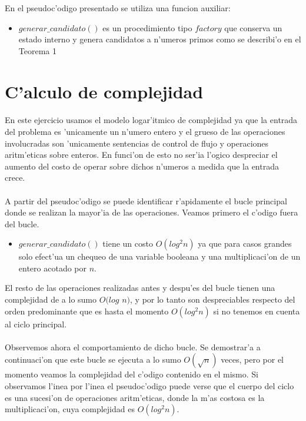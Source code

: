 En el pseudoc'odigo presentado se utiliza una funcion auxiliar:
\begin{itemize}
\item $generar\_candidato()$ es un procedimiento tipo $factory$ que conserva un estado interno 
y genera candidatos a n'umeros primos como se describi'o en el Teorema 1
\end{itemize}

\section{C'alculo de complejidad}
\paragraph{}
En este ejercicio usamos el modelo logar'itmico de complejidad ya que la entrada del problema es 'unicamente un
n'umero entero y el grueso de las operaciones involucradas son 'unicamente sentencias de control de flujo
y operaciones aritm'eticas sobre enteros. En funci'on de esto no ser'ia l'ogico despreciar el aumento del costo
de operar sobre dichos n'umeros a medida que la entrada crece.

\paragraph{}
A partir del pseudoc'odigo se puede identificar r'apidamente el bucle principal donde se realizan la mayor'ia
de las operaciones. Veamos primero el c'odigo fuera del bucle.
\begin{itemize}
\item $generar\_candidato()$ tiene un costo $O(log^2 n)$ ya que para casos grandes solo efect'ua un chequeo de
una variable booleana y una multiplicaci'on de un entero acotado por $n$.
\end{itemize}
El resto de las operaciones realizadas antes y despu'es del bucle tienen una complejidad de a lo sumo $O(log$ $n)$,
y por lo tanto son despreciables respecto del orden predominante que es hasta el momento $O(log^2 n)$ si no tenemos
en cuenta al ciclo principal.

\paragraph{}
Observemos ahora el comportamiento de dicho bucle. Se demostrar'a a continuaci'on que este bucle se ejecuta a lo sumo
$O(\sqrt{n})$ veces, pero por el momento veamos la complejidad del c'odigo contenido en el mismo. Si observamos
l'inea por l'inea el pseudoc'odigo puede verse que el cuerpo del ciclo es una sucesi'on de operaciones aritm'eticas,
donde la m'as costosa es la multiplicaci'on, cuya complejidad es $O(log^2 n)$.

